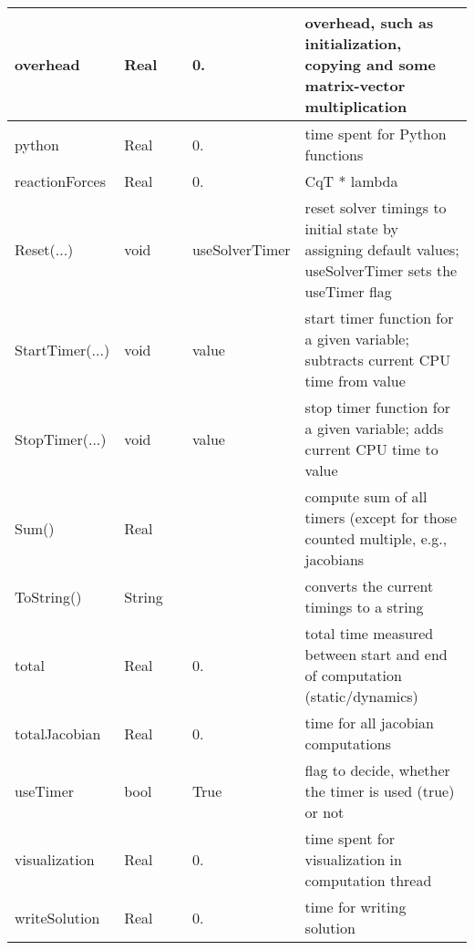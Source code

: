 \begin{center}
\begin{longtable}{| p{4.2cm} | p{2.5cm} | p{0.3cm} | p{3.0cm} | p{6cm} |}
    overhead &     Real &      &     0. &     overhead, such as initialization, copying and some matrix-vector multiplication\\ \hline
    python &     Real &      &     0. &     time spent for Python functions\\ \hline
    reactionForces &     Real &      &     0. &     CqT * lambda\\ \hline
    Reset(...) &     void &      &     useSolverTimer &     reset solver timings to initial state by assigning default values; useSolverTimer sets the useTimer flag\\ \hline
    StartTimer(...) &     void &      &     value &     start timer function for a given variable; subtracts current CPU time from value\\ \hline
    StopTimer(...) &     void &      &     value &     stop timer function for a given variable; adds current CPU time to value\\ \hline
    Sum() &     Real &      &      &     compute sum of all timers (except for those counted multiple, e.g., jacobians\\ \hline
    ToString() &     String &      &      &     converts the current timings to a string\\ \hline
    total &     Real &      &     0. &     total time measured between start and end of computation (static/dynamics)\\ \hline
    totalJacobian &     Real &      &     0. &     time for all jacobian computations\\ \hline
    useTimer &     bool &      &     True &     flag to decide, whether the timer is used (true) or not\\ \hline
    visualization &     Real &      &     0. &     time spent for visualization in computation thread\\ \hline
    writeSolution &     Real &      &     0. &     time for writing solution\\ \hline
	  \end{longtable}
	\end{center}


